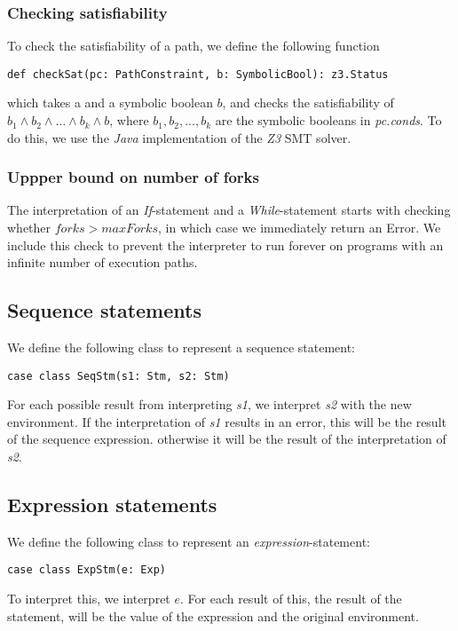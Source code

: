 \subsubsection{Checking satisfiability}
To check the satisfiability of a path, we define the following function

\begin{lstlisting}[style=simple]
def checkSat(pc: PathConstraint, b: SymbolicBool): z3.Status
\end{lstlisting}
which takes a \pc  and a symbolic boolean $b$, and checks the satisfiability of $b_1 \land b_2 \land \ldots \land b_k \land b$, where $b_1, b_2, \ldots, b_k$ are the symbolic booleans in \textsl{pc.conds}. To do this, we use the \textsl{Java} implementation of the \textsl{Z3} SMT solver. 
 
\subsubsection{Uppper bound on number of forks}

The interpretation of an \textsl{If}-statement and a \textsl{While}-statement starts with checking whether $forks > maxForks$, in which case we immediately return an Error. We include this check to prevent the interpreter to run forever on programs with an infinite number of execution paths. 

\subsection{Sequence statements}

We define the following class to represent a sequence statement:
\begin{lstlisting}[style=simple]
	case class SeqStm(s1: Stm, s2: Stm)
\end{lstlisting}
For each possible result from interpreting \textsl{s1}, we interpret \textsl{s2} with the new environment. If the interpretation of \textsl{s1} results in an error, this will be the result of the sequence expression. otherwise it will be the result of the interpretation of \textsl{s2}. 	

\subsection{Expression statements}
We define the following class to represent an \textsl{expression}-statement:
\begin{lstlisting}[style=simple]
case class ExpStm(e: Exp)
\end{lstlisting}
To interpret this, we interpret $e$. For each result of this, the result of the statement, will be the value of the expression and the original environment. 
